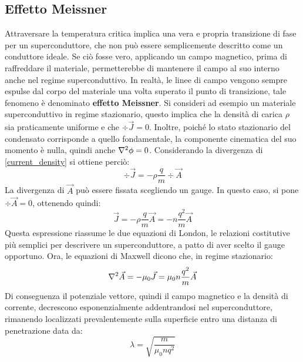 \subsection{Effetto Meissner}
Attraversare la temperatura critica implica una vera e propria transizione di fase per un superconduttore, che non può essere semplicemente descritto come un conduttore ideale. Se ciò fosse vero, applicando un campo magnetico, prima di raffreddare il materiale, permetterebbe di mantenere il campo al suo interno anche nel regime superconduttivo. In realtà, le linee di campo vengono sempre espulse dal corpo del materiale una volta superato il punto di transizione, tale fenomeno è denominato \textbf{effetto Meissner}. Si consideri ad esempio un materiale superconduttivo in regime stazionario, questo implica che la densità di carica $\rho$ sia praticamente uniforme e che $\div \vec J=0$. Inoltre, poiché lo stato stazionario del condensato corrisponde a quello fondamentale, la componente cinematica del suo momento è nulla, quindi anche $\laplacian \phi=0$. Considerando la divergenza di \eqref{current_density} si ottiene perciò:
\begin{equation*}
    \div \vec J=-\rho\frac q m \div \vec A
\end{equation*}
La divergenza di $\vec A$ può essere fissata scegliendo un gauge. In questo caso, si pone $\div \vec A=0$, ottenendo quindi:
\begin{equation*}
    \vec J=-\rho\frac q m \vec A=-n\frac {q^2} m \vec A
\end{equation*}
Questa espressione riassume le due equazioni di London, le relazioni costitutive più semplici per descrivere un superconduttore, a patto di aver scelto il gauge opportuno. Ora, le equazioni di Maxwell dicono che, in regime stazionario:
\begin{equation*}
    \laplacian \vec A=-\mu_0\vec J=\mu_0n\frac {q^2} m \vec A
\end{equation*}
Di conseguenza il potenziale vettore, quindi il campo magnetico e la densità di corrente, decrescono esponenzialmente addentrandosi nel superconduttore, rimanendo localizzati prevalentemente sulla superficie entro una distanza di penetrazione data da:
\begin{equation*}
    \lambda=\sqrt{\frac{m}{\mu_0nq^2}}
\end{equation*}

